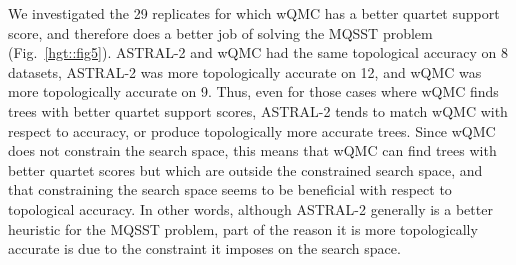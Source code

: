 We investigated the 29 replicates for which wQMC has a better quartet support score, and therefore does a better job of solving the MQSST problem
(Fig.~\ref{hgt::fig5}).
ASTRAL-2 and wQMC had the same topological accuracy on 8 datasets,
ASTRAL-2 was more topologically accurate on 12, and
wQMC was more topologically accurate on 9. 
Thus, even for those cases where wQMC finds trees with better quartet
support scores, ASTRAL-2 
tends to match wQMC with respect to accuracy, or 
produce topologically more accurate trees.
Since wQMC does not constrain the search space, this means
that wQMC can find trees with better quartet scores but which are
outside the constrained search space, and that constraining
the search space seems to be beneficial with respect to
topological accuracy. In other words, 
although ASTRAL-2 generally is a better heuristic for the MQSST
problem, part of the reason it is more topologically accurate
is due to the constraint it imposes on the search space.


